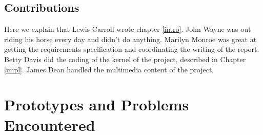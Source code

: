 \documentclass{l3proj}
\begin{document}
\section{Contributions}
\label{contributions}

Here we explain that Lewis Carroll wrote chapter \ref{intro}. John Wayne
was out riding his horse every day and didn't do anything. Marilyn Monroe
was great at getting the requirements specification and coordinating the
writing of the report. Betty Davis did the coding of the kernel of the
project, described in Chapter \ref{impl}.  James Dean handled the
multimedia content of the project.




\appendix


\chapter{Prototypes and Problems Encountered}








\end{document}
